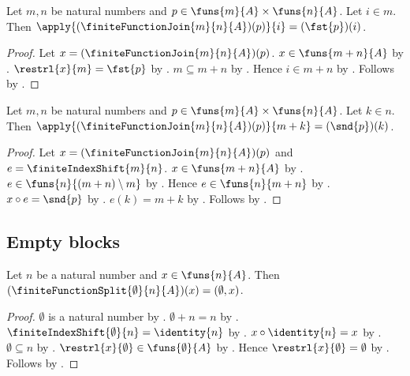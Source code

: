\begin{proposition}\label{finite_function_join_left_coordinate}
    Let $m,n$ be natural numbers and $p\in\funs{m}{A}\times\funs{n}{A}$.
    Let $i\in m$.
    Then $\apply{(\finiteFunctionJoin{m}{n}{A})(p)}{i}=(\fst{p})(i)$.
\end{proposition}
\begin{proof}
    Let $x=(\finiteFunctionJoin{m}{n}{A})(p)$.
    $x\in\funs{m+n}{A}$ by
        .
    $\restrl{x}{m}=\fst{p}$ by .
    $m\subseteq m+n$ by .
    Hence $i\in m+n$ by .
    Follows by .
\end{proof}

\begin{proposition}\label{finite_function_join_right_coordinate}
    Let $m,n$ be natural numbers and $p\in\funs{m}{A}\times\funs{n}{A}$.
    Let $k\in n$.
    Then $\apply{(\finiteFunctionJoin{m}{n}{A})(p)}{m+k}=(\snd{p})(k)$.
\end{proposition}
\begin{proof}
    Let $x=(\finiteFunctionJoin{m}{n}{A})(p)$ and $e=\finiteIndexShift{m}{n}$.
    $x\in\funs{m+n}{A}$ by
        .
    $e\in\funs{n}{(m+n)\setminus m}$ by .
    Hence $e\in\funs{n}{m+n}$ by .
    $x\circ e=\snd{p}$ by .
    $e(k)=m+k$ by .
    Follows by .
\end{proof}

\subsection{Empty blocks}

\begin{proposition}\label{finite_function_split_zero_left_apply}
    Let $n$ be a natural number and $x\in\funs{n}{A}$.
    Then $(\finiteFunctionSplit{\emptyset}{n}{A})(x)=(\emptyset,x)$.
\end{proposition}
\begin{proof}
    $\emptyset$ is a natural number by .
    $\emptyset+n=n$ by .
    $\finiteIndexShift{\emptyset}{n}=\identity{n}$ by .
    $x\circ\identity{n}=x$ by .
    $\emptyset\subseteq n$ by .
    $\restrl{x}{\emptyset}\in\funs{\emptyset}{A}$ by .
    Hence $\restrl{x}{\emptyset}=\emptyset$ by
        .
    Follows by .
\end{proof}

